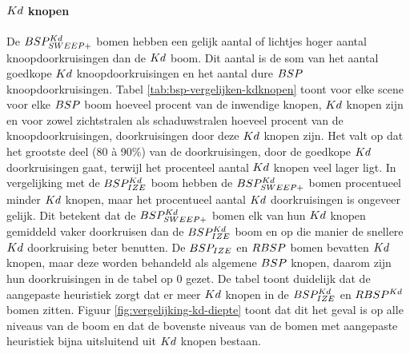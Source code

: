 \paragraph{$Kd$ knopen}
De $BSP^{Kd}_{SWEEP+}$ bomen hebben een gelijk aantal of lichtjes hoger aantal knoopdoorkruisingen dan de $Kd$ boom. Dit aantal is de som van het aantal goedkope $Kd$ knoopdoorkruisingen en het aantal dure $BSP$ knoopdoorkruisingen. Tabel \ref{tab:bsp-vergelijken-kdknopen} toont voor elke scene voor elke $BSP$ boom hoeveel procent van de inwendige knopen, $Kd$ knopen zijn en voor zowel zichtstralen als schaduwstralen hoeveel procent van de knoopdoorkruisingen, doorkruisingen door deze $Kd$ knopen zijn. Het valt op dat het grootste deel (80 à 90\%) van de doorkruisingen, door de goedkope $Kd$ doorkruisingen gaat, terwijl het procenteel aantal $Kd$ knopen veel lager ligt. In vergelijking met de $BSP^{Kd}_{IZE}$ boom hebben de $BSP^{Kd}_{SWEEP+}$ bomen procentueel minder $Kd$ knopen, maar het procentueel aantal $Kd$ doorkruisingen is ongeveer gelijk.
Dit betekent dat de $BSP^{Kd}_{SWEEP+}$ bomen elk van hun $Kd$ knopen gemiddeld vaker doorkruisen dan de $BSP^{Kd}_{IZE}$ boom en op die manier de snellere $Kd$ doorkruising beter benutten.
De $BSP_{IZE}$ en $RBSP$ bomen bevatten $Kd$ knopen, maar deze worden behandeld als algemene $BSP$ knopen, daarom zijn hun doorkruisingen in de tabel op 0 gezet. De tabel toont duidelijk dat de aangepaste heuristiek zorgt dat er meer $Kd$ knopen in de $BSP^{Kd}_{IZE}$ en $RBSP^{Kd}$ bomen zitten. Figuur \ref{fig:vergelijking-kd-diepte} toont dat dit het geval is op alle niveaus van de boom en dat de bovenste niveaus van de bomen met aangepaste heuristiek bijna uitsluitend uit $Kd$ knopen bestaan.

